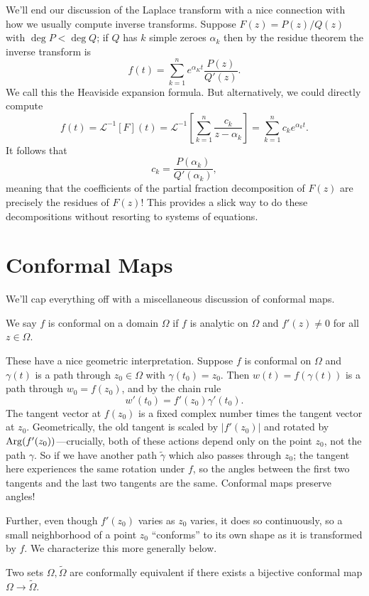 \documentclass[../m136main.tex]{subfiles}
\begin{document}
We'll end our discussion of the Laplace transform with a nice connection with how we usually compute inverse transforms.
Suppose $F(z) = P(z) / Q(z)$ with $\deg P < \deg Q$; if $Q$ has $k$ simple zeroes $\alpha_k$ then by the residue theorem the inverse transform is
\[ f(t) = \sum_{k=1}^{n} e^{\alpha_K t} \frac{P(z)}{Q'(z)}. \]
We call this the Heaviside expansion formula.
But alternatively, we could directly compute
\[ f(t) = \mathcal L^{-1}[F](t) = \mathcal L^{-1} \left[ \sum_{k=1}^{n} \frac{c_k}{z - \alpha_k} \right] = \sum_{k=1}^{n} c_k e^{\alpha_k t}. \]
It follows that
\[ c_k = \frac{P(\alpha_k)}{Q'(\alpha_k)}, \]
meaning that the coefficients of the partial fraction decomposition of $F(z)$ are precisely the residues of $F(z)$!
This provides a slick way to do these decompositions without resorting to systems of equations.

\section{Conformal Maps}
We'll cap everything off with a miscellaneous discussion of conformal maps.

\begin{definition}
    We say $f$ is conformal on a domain $\Omega$ if $f$ is analytic on $\Omega$ and $f'(z) \neq 0$ for all $z \in \Omega$.
\end{definition}

These have a nice geometric interpretation.
Suppose $f$ is conformal on $\Omega$ and $\gamma(t)$ is a path through $z_0 \in \Omega$ with $\gamma(t_0) = z_0$.
Then $w(t) = f(\gamma(t))$ is a path through $w_0 = f(z_0)$, and by the chain rule
\[ w'(t_0) = f'(z_0) \gamma'(t_0). \]
The tangent vector at $f(z_0)$ is a fixed complex number times the tangent vector at $z_0$.
Geometrically, the old tangent is scaled by $|f'(z_0)|$ and rotated by $\operatorname{Arg}(f'(z_0))$---crucially, both of these actions depend only on the point $z_0$, not the path $\gamma$.
So if we have another path $\tilde \gamma$ which also passes through $z_0$; the tangent here experiences the same rotation under $f$, so the angles between the first two tangents and the last two tangents are the same.
Conformal maps preserve angles!

Further, even though $f'(z_0)$ varies as $z_0$ varies, it does so continuously, so a small neighborhood of a point $z_0$ ``conforms'' to its own shape as it is transformed by $f$.
We characterize this more generally below.

\begin{definition}
    Two sets $\Omega, \tilde \Omega$ are conformally equivalent if there exists a bijective conformal map $\Omega \to \tilde \Omega$.
\end{definition}
\end{document}
